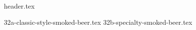 \clearpage
{}
\divisorLine
{header.tex}
\begin{multicols}{2}
{32a-classic-style-smoked-beer.tex}
{32b-specialty-smoked-beer.tex}
\end{multicols}